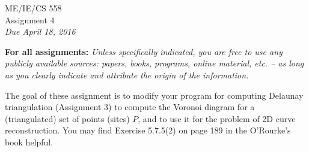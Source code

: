 \documentclass[11pt]{article}
\begin{document}
\begin{center}
{\Large ME/IE/CS 558}\\
\vspace{12pt}
{\large Assignment 4}\\
\vspace{12pt}
{\em Due April 18, 2016}
\end{center}

{\bf For all assignments:}
{\em Unless specifically indicated,  you are free to use any
publicly available sources: papers, books, programs, online
material, etc. -- as long as you clearly indicate and attribute
the origin of the information.}


\vspace{24pt}
The goal of these assignment is to modify your program for 
computing Delaunay triangulation
(Assignment 3) to compute the Voronoi diagram for a (triangulated)
set of points (sites) $P$,  and to use it for the problem of 2D
curve reconstruction.   You may find 
Exercise 5.7.5(2) on page 189 in the O'Rourke's book helpful.
\end{document}
